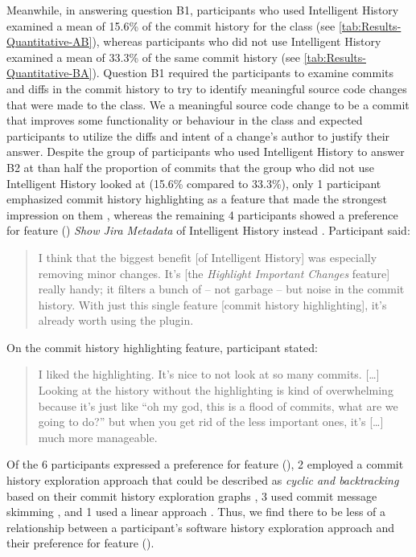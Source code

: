 Meanwhile, in answering question B1, participants who used Intelligent History 
examined a mean of 15.6\% of the commit history for the  class (see \autoref{tab:Results-Quantitative-AB}),
whereas participants who did not use Intelligent History examined a mean of 33.3\% of the same 
commit history (see \autoref{tab:Results-Quantitative-BA}).
Question B1 required the participants to examine commits and diffs in the  commit history 
to try to identify meaningful source code changes that were made to the class.
We  a meaningful source code change to be a commit that improves some functionality 
or behaviour in the class and expected participants to utilize the diffs and intent of a change's author to justify their answer.
Despite  the group of participants who used Intelligent History to answer B2  at  than half the 
proportion of commits that the group who did not use Intelligent History looked at (15.6\% compared to 33.3\%),
only 1 participant emphasized commit history highlighting as a feature that made the strongest impression on them , 
whereas the remaining 4 participants showed a preference for feature 
() \textit{Show Jira Metadata} of Intelligent History instead .
Participant  said:

\begin{quote}
  I think that the biggest benefit [of Intelligent History] was especially removing minor changes. 
  It’s [the \textit{Highlight Important Changes} feature] really handy; it filters a bunch of -- not garbage -- but noise in the commit history. 
  With just this single feature [commit history highlighting], it’s already worth using the plugin.
\end{quote}

On the commit history highlighting feature, participant  stated:

\begin{quote}
  I liked the highlighting. 
  It’s nice to not look at so many commits. 
  [\dots] Looking at the history without the highlighting is kind of overwhelming because it’s just like ``oh my god, this is a flood of commits, 
  what are we going to do?'' 
  but when you get rid of the less important ones, it’s [\dots] much more manageable.
\end{quote}

Of the 6 participants  expressed a preference for feature (), 
2 employed a commit history exploration approach that could be described as \textit{cyclic and backtracking} based on their commit history exploration graphs ,
3 used commit message skimming , and 1 used a linear approach .
Thus, we find there to be less of a relationship between a participant's software history exploration approach 
and their preference for feature ().

